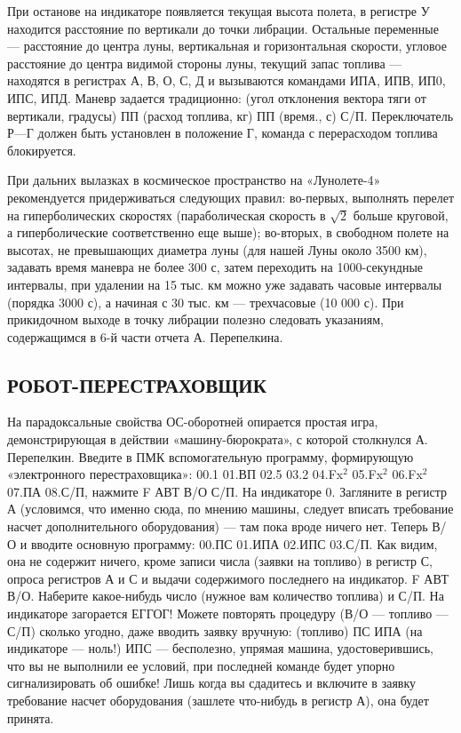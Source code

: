 \documentclass[11pt,a4paper,oneside]{article}
\begin{document}
При останове на индикаторе появляется текущая высота полета, в регистре У находится расстояние по вертикали до точки либрации. Остальные переменные — расстояние до центра луны, вертикальная и горизонтальная скорости, угловое расстояние до центра видимой стороны луны, текущий запас топлива — находятся в регистрах А, В, О, С, Д и вызываются командами ИПА, ИПВ, ИП0, ИПС, ИПД. Маневр задается традиционно: (угол отклонения вектора тяги от вертикали, градусы) ПП (расход топлива, кг) ПП (время., с) С/П. Переключатель Р—Г должен быть установлен в положение Г, команда с перерасходом топлива блокируется.

При дальних вылазках в космическое пространство на «Лунолете-4» рекомендуется придерживаться следующих правил: во-первых, выполнять перелет на гиперболических скоростях (параболическая скорость в $\sqrt{2}$ больше круговой, а гиперболические соответственно еще выше); во-вторых, в свободном полете на высотах, не превышающих диаметра луны (для нашей Луны около 3500 км), задавать время маневра не более 300 с, затем переходить на 1000-секундные интервалы, при удалении на 15 тыс. км
можно уже задавать часовые интервалы (порядка 3000 с), а начиная с 30 тыс. км — трехчасовые (10 000 с). При прикидочном выходе в точку либрации полезно следовать указаниям, содержащимся в 6-й части отчета А. Перепелкина.

\subsection{РОБОТ-ПЕРЕСТРАХОВЩИК}
На парадоксальные свойства ОС-оборотней опирается простая игра, демонстрирующая в действии «машину-бюрократа», с которой столкнулся А. Перепелкин. Введите в ПМК вспомогательную программу, формирующую «электронного перестраховщика»: 00.1 01.ВП 02.5 03.2 04.Fx$^{2}$ 05.Fx$^{2}$ 06.Fx$^{2}$ 07.ПА 08.С/П, нажмите F АВТ В/О С/П. На индикаторе 0. Загляните в регистр А (условимся, что именно сюда, по мнению машины, следует вписать требование насчет дополнительного оборудования) — там пока вроде ничего нет. Теперь В/О и вводите основную программу: 00.ПС 01.ИПА 02.ИПС 03.С/П. Как видим, она не содержит ничего, кроме записи числа (заявки на топливо) в регистр С, опроса регистров А и С и выдачи содержимого последнего на индикатор. F АВТ В/О. Наберите какое-нибудь число (нужное вам количество топлива) и С/П. На индикаторе загорается ЕГГОГ! Можете повторять процедуру (В/О — топливо — С/П) сколько угодно, даже вводить заявку вручную: (топливо) ПС ИПА (на индикаторе — ноль!) ИПС — бесполезно, упрямая машина, удостоверившись, что вы не выполнили ее условий, при последней команде будет упорно сигнализировать об ошибке! Лишь когда вы сдадитесь и включите в заявку требование насчет оборудования (зашлете что-нибудь в регистр А), она будет принята.
\end{document}
